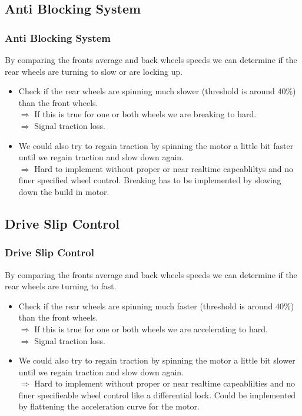 \documentclass{beamer}
\begin{document}
\subsection{Anti Blocking System}
\begin{frame}
    \frametitle{Anti Blocking System}
    By comparing the fronts average and back wheels speeds we can determine if the rear wheels are turning to slow or are locking up. 
    \begin{itemize}
     \item Check if the rear wheels are spinning much slower (threshold is around 40\%) than the front wheels.\\
     $\Rightarrow$ If this is true for one or both wheels we are breaking to hard.\\
     $\Rightarrow$ Signal traction loss.
     \pause
     \item We could also try to regain traction by spinning the motor a little bit faster until we regain traction and slow down again.\\
     $\Rightarrow$ Hard to implement without proper or near realtime capeabliltys and no finer specified wheel control. Breaking has to be implemented by slowing down the build in motor. \\
     \pause
    \end{itemize}
\end{frame}
\subsection{Drive Slip Control}
\begin{frame}
    \frametitle{Drive Slip Control}
    By comparing the fronts average and back wheels speeds we can determine if the rear wheels are turning to fast. 
    \begin{itemize}
     \item Check if the rear wheels are spinning much faster (threshold is around 40\%) than the front wheels.\\
     $\Rightarrow$ If this is true for one or both wheels we are accelerating to hard.\\
     $\Rightarrow$ Signal traction loss.
     \pause
     \item We could also try to regain traction by spinning the motor a little bit slower until we regain traction and slow down again.\\
     $\Rightarrow$ Hard to implement without proper or near realtime capeablilties and no finer specifieable wheel control like a differential lock. Could be implemented by flattening the acceleration curve for the motor. \\
     \pause
    \end{itemize}
\end{frame}
\end{document}
